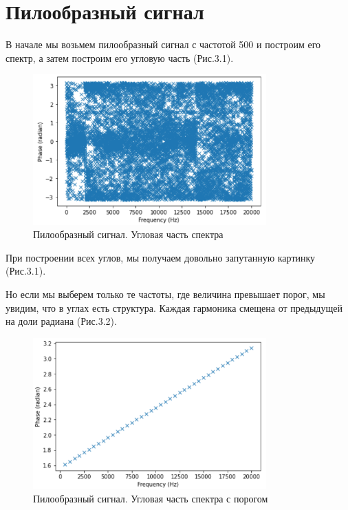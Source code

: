 \documentclass[a4paper,12pt]{report}
\begin{document}
\section{Пилообразный сигнал}      
    В начале мы возьмем пилообразный сигнал с частотой 500 и построим его спектр, а затем построим его угловую часть (Рис.3.1).
\begin{figure}[H]
        \centering
        \includegraphics[width=0.8\textwidth]{fig3-1.PNG}
        \caption{Пилообразный сигнал. Угловая часть спектра}
        \label{fig:fig3-1}
\end{figure}

    При построении всех углов, мы получаем довольно запутанную картинку (Рис.3.1).
    
    Но если мы выберем только те частоты, где величина превышает порог, мы увидим, что в углах есть структура. Каждая гармоника смещена от предыдущей на доли радиана (Рис.3.2).
\begin{figure}[H]
        \centering
        \includegraphics[width=0.8\textwidth]{fig3-2.PNG}
        \caption{Пилообразный сигнал. Угловая часть спектра с порогом}
        \label{fig:fig3-2}
\end{figure} 
\end{document}

